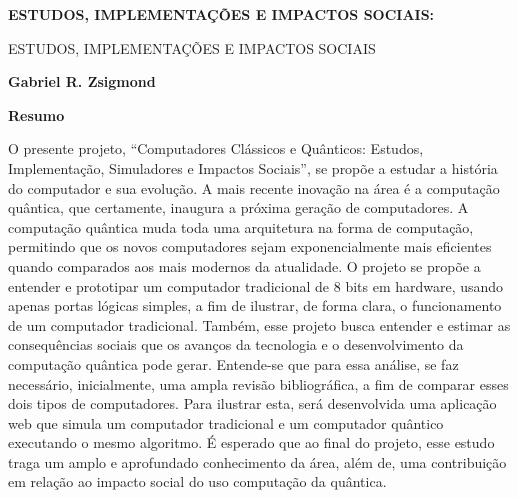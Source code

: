 \thispagestyle{plain}
\begin{center}
    \Large
    \textbf{ESTUDOS, IMPLEMENTAÇÕES E IMPACTOS SOCIAIS:}
    
    \vspace{0.2cm}
    \large
    ESTUDOS, IMPLEMENTAÇÕES E IMPACTOS SOCIAIS
    
    \vspace{0.2cm}
    \textbf{Gabriel R. Zsigmond}
    
    \vspace{0.4cm}
    \textbf{Resumo}
\end{center}
O presente projeto, ``Computadores Clássicos e Quânticos: Estudos, Implementação, Simuladores e Impactos Sociais'', se propõe a estudar a história do computador e sua evolução. A mais recente inovação na área é a computação quântica, que certamente, inaugura a próxima geração de computadores. A computação quântica muda toda uma arquitetura na forma de computação, permitindo que os novos computadores sejam exponencialmente mais eficientes quando comparados aos mais modernos da atualidade. O projeto se propõe a entender e prototipar um computador tradicional de 8 bits em hardware, usando apenas portas lógicas simples, a fim de ilustrar, de forma clara, o funcionamento de um computador tradicional. Também, esse projeto busca entender e estimar as consequências sociais que os avanços da tecnologia e o desenvolvimento da computação quântica pode gerar. Entende-se que para essa análise, se faz necessário, inicialmente, uma ampla revisão bibliográfica, a fim de comparar esses dois tipos de computadores. Para ilustrar esta, será desenvolvida uma aplicação web que simula um computador tradicional e um computador quântico executando o mesmo algoritmo. É esperado que ao final do projeto, esse estudo traga um amplo e aprofundado conhecimento da área, além de, uma contribuição em relação ao impacto social do uso computação da quântica.